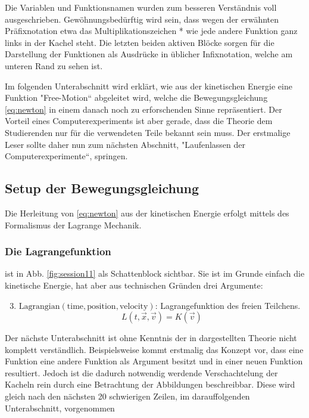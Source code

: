 \documentclass[twocolumn, 10pt]{article}
\newcommand{\varA}[1]{{\operatorname{#1}}}
\begin{document}
Die Variablen und Funktionsnamen wurden zum besseren Verständnis voll ausgeschrieben. Gewöhnungsbedürftig wird sein, dass wegen der erwähnten Präfixnotation etwa das Multiplikationszeichen * wie jede andere Funktion ganz links in der Kachel steht. Die letzten beiden aktiven Blöcke sorgen für die Darstellung der Funktionen als Ausdrücke in üblicher Infixnotation, welche am unteren Rand zu sehen ist.

Im folgenden Unterabschnitt wird erklärt, wie aus der kinetischen Energie eine Funktion "Free-Motion“ abgeleitet wird, welche die Bewegungsgleichung \ref{eq:newton} in einem danach noch zu erforschenden Sinne repräsentiert. Der Vorteil eines Computerexperiments ist aber gerade, dass die Theorie dem Studierenden nur für die verwendeten Teile bekannt sein muss. Der erstmalige Leser sollte daher nun zum nächsten Abschnitt, "Laufenlassen der Computerexperimente“, springen.

\subsection{Setup der Bewegungsgleichung}
Die Herleitung von \ref{eq:newton} aus der kinetischen Energie erfolgt mittels des Formalismus der Lagrange Mechanik.

\subsubsection{Die Lagrangefunktion}

ist in Abb. \ref{fig:session11} als Schattenblock sichtbar. Sie ist im Grunde einfach die kinetische Energie, hat aber aus technischen Gründen drei Argumente:
\begin{enumerate}[label=(\alph*)]
\setcounter{enumi}{2}
\item $\varA{Lagrangian(time, position, velocity)}$: Lagrangefunktion des freien Teilchens.
\begin{equation}
L(t, \vec{x}, \vec{v}) = K(\vec{v})
\end{equation}
\end{enumerate}

Der nächste Unterabschnitt ist ohne Kenntnis der in \cite{cSICM 7} dargestellten Theorie nicht komplett verständlich. Beispielsweise kommt erstmalig das Konzept vor, dass eine Funktion eine andere Funktion als Argument besitzt und in einer neuen Funktion resultiert. Jedoch ist die dadurch notwendig werdende Verschachtelung der Kacheln rein durch eine Betrachtung der Abbildungen beschreibbar. Diese wird gleich nach den nächsten 20 schwierigen Zeilen, im darauffolgenden Unterabschnitt, vorgenommen
\end{document}
